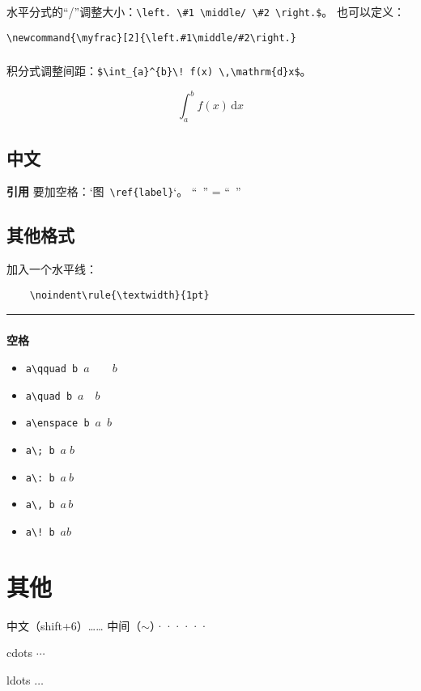 \documentclass{article}
\begin{document}
水平分式的“/”调整大小：\verb|\left. \#1 \middle/ \#2 \right.$|。
也可以定义：
\begin{lstlisting}
\newcommand{\myfrac}[2]{\left.#1\middle/#2\right.}
\end{lstlisting}
\subsubsection{}

积分式调整间距：\verb|$\int_{a}^{b}\! f(x) \,\mathrm{d}x$|。

$$
\int_{a}^{b}\! f(x) \,\mathrm{d}x
$$



\subsection{中文}

\textbf{引用}
要加空格：`图~\verb|\ref{label}|`。
“~” = “\ ”



\subsubsection{}
\subsection{其他格式}
加入一个水平线：
\begin{lstlisting}
	\noindent\rule{\textwidth}{1pt}
\end{lstlisting}


\noindent\rule{\textwidth}{1pt}

\subsubsection{}
\textbf{空格}
\begin{itemize}
	\item \verb|a\qquad b|~$a\qquad b$
	\item \verb|a\quad b|~$a\quad b$
	\item \verb|a\enspace b|~$a\enspace b$
	\item \verb|a\; b|~$a\; b$
	\item \verb|a\: b|~$a\: b$
	\item \verb|a\, b|~$a\, b$
	\item \verb|a\! b|~$a\! b$
\end{itemize}



\section{其他}
中文（shift+6）…… 中间（$\sim$）······

cdots $\cdots$

ldots $\ldots$
\end{document}
